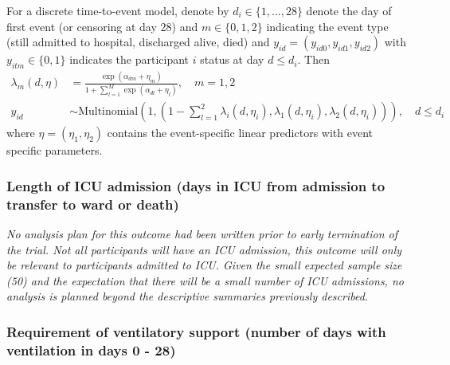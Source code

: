 \documentclass[11pt,parskip=half-]{scrartcl}
\begin{document}
For a discrete time-to-event model, denote by $d_i\in\{1,...,28\}$ denote the day of first event (or censoring at day 28) and $m\in\{0,1,2\}$ indicating the event type (still admitted to hospital, discharged alive, died) and $y_{id} = (y_{id0}, y_{id1}, y_{id2})$ with $y_{itm}\in\{0,1\}$ indicates the participant $i$ status at day $d\leq d_i$. Then
$$
\begin{aligned}
\lambda_m(d, \eta) &= \frac{\exp(\alpha_{dm} + \eta_m)}{1 + \sum_{l=1}^M \exp(\alpha_{dl} + \eta_l)},\quad m=1,2 \\
y_{id} &\sim \text{Multinomial}\left(1, \left(1 - \sum_{l=1}^2 \lambda_i(d,\eta_i), \lambda_1(d, \eta_i), \lambda_2(d, \eta_i)\right)\right),\quad d\leq d_i
\end{aligned}
$$
where $\eta=(\eta_1,\eta_2)$ contains the event-specific linear predictors with event specific parameters.

\subsubsection{Length of ICU admission (days in ICU from admission to transfer to ward or death)}

\textit{No analysis plan for this outcome had been written prior to early termination of the trial. Not all participants will have an ICU admission, this outcome will only be relevant to participants admitted to ICU. Given the small expected sample size (50) and the expectation that there will be a small number of ICU admissions, no analysis is planned beyond the descriptive summaries previously described.}

\subsubsection{Requirement of ventilatory support (number of days with ventilation in days 0 - 28)}\label{sec:vent-support}
\end{document}
